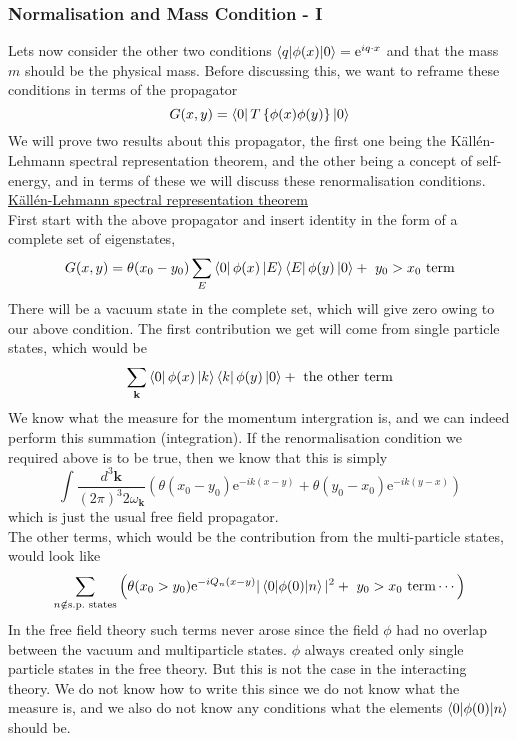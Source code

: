 \documentclass[11pt]{article}
\newcommand{\e}{\mathrm{e}}
\newcommand{\w}{\omega}
\numberwithin{equation}{section}
\begin{document}
\subsubsection{Normalisation and Mass Condition - I}

Lets now consider the other two conditions \(\braket{q|\phi(x)|0} = \e^{iq\cdot x}\) and that the mass \(m\) should be the physical mass. 
Before discussing this, we want to reframe these conditions in terms of the propagator 
\begin{equation*}
    G(x,y) = \bra{0} T\left\{ \phi(x) \phi(y) \right\}\ket{0}
\end{equation*}
We will prove two results about this propagator, the first one being the K\"all\'en-Lehmann spectral representation theorem, and the other being a concept of self-energy, and in terms of these we will discuss these renormalisation conditions.\\

\underline{K\"all\'en-Lehmann spectral representation theorem}\\
First start with the above propagator and insert identity in the form of a complete set of eigenstates, 
\begin{equation*}
    G(x,y) = \theta(x_0-y_0)\sum_{E} \bra{0} \phi(x) \ket{E}\bra{E} \phi(y) \ket{0} + ~y_0>x_0\text{ term}
\end{equation*}
There will be a vacuum state in the complete set, which will give zero owing to our above condition. The first contribution we get will come from single particle states, which would be 
\begin{equation*}
    \sum_{\textbf{k}} \bra{0}\phi(x)\ket{{k}}\bra{{k}}\phi(y)\ket{0} + ~\text{the other term}
\end{equation*}
We know what the measure for the momentum intergration is, and we can indeed perform this summation (integration). If the renormalisation condition we required above is to be true, then we know that this is simply 
\begin{equation*}
    \int \frac{d^3\textbf{k}}{(2\pi)^3 2\w_\textbf{k}} \left( \theta(x_0 - y_0)\e^{-ik(x-y)} + \theta(y_0 - x_0)\e^{-ik(y-x)} \right)
\end{equation*}
which is just the usual free field propagator.\\
The other terms, which would be the contribution from the multi-particle states, would look like 
\begin{equation*}
    \sum_{n\notin \text{s.p.\ states}} \left( \theta(x_0>y_0) \e^{-iQ_n(x-y)}|\braket{0|\phi(0)|n}|^2  + ~y_0>x_0\text{~term}\cdots\right)
\end{equation*}
In the free field theory such terms never arose since the field \(\phi\) had no overlap between the vacuum and multiparticle states. \(\phi\) always created only single particle states in the free theory. But this is not the case in the interacting theory. We do not know how to write this since we do not know what the measure is, and we also do not know any conditions what the elements \(\braket{0|\phi(0)|n}\) should be.\\
\end{document}

